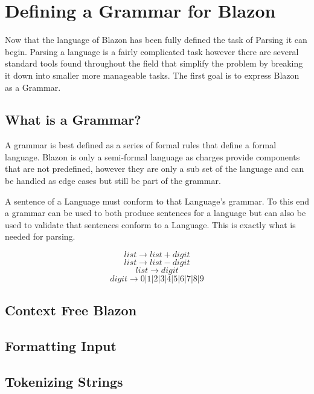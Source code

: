 \chapter{Defining a Grammar for Blazon}

Now that the language of Blazon has been fully defined the task of Parsing it can begin.  Parsing a language is a fairly complicated task however there are several standard tools found throughout the field that simplify the problem by breaking it down into smaller more manageable tasks. The first goal is to express Blazon as a Grammar. 


\section{What is a Grammar?}
A grammar is best defined as a series of formal rules that define a formal language.  Blazon is only a semi-formal language as charges provide components that are not predefined, however they are only a sub set of the language and can be handled as edge cases but still be part of the grammar.  

A sentence of a Language must conform to that Language's grammar.  To this end a grammar can be used to both produce sentences for a language but can also be used to validate that sentences conform to a Language. This is exactly what is needed for parsing. 



$$ 	list \rightarrow  list + digit  $$
$$	list \to list - digit  $$
$$  list \to digit $$
$$  digit \to 0|1|2|3|4|5|6|7|8|9 $$



\section{Context Free Blazon}

\section{Formatting Input}

\section{Tokenizing Strings} 